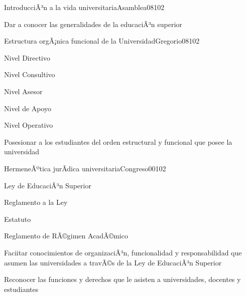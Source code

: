 \begin{syllabus}
\begin{unit}{IntroducciÃ³n a la vida universitaria}{Asamblea08}{10}{2}
   \begin{unitgoals}
      \item Dar a conocer las generalidades de la educaciÃ³n superior
   \end{unitgoals}
\end{unit}

\begin{unit}{Estructura orgÃ¡nica funcional de la Universidad}{Gregorio08}{10}{2}
   \begin{topics}
        \item Nivel Directivo
	\item Nivel Consultivo
	\item Nivel Asesor
	\item Nivel de Apoyo
	\item Nivel Operativo
  \end{topics}

   \begin{unitgoals}
      \item Posesionar a los estudiantes del orden estructural y funcional que posee la universidad
   \end{unitgoals}
\end{unit}

\begin{unit}{HermeneÃºtica jurÃ­dica universitaria}{Congreso00}{10}{2}
   \begin{topics}
        \item Ley de EducaciÃ³n Superior 
	\item Reglamento a la Ley
	\item Estatuto
	\item Reglamento de RÃ©gimen AcadÃ©mico
   \end{topics}

   \begin{unitgoals}
      \item Faciitar conocimientos de organizaciÃ³n, funcionalidad y responsabilidad que asumen las universidades a travÃ©s de la Ley de EducaciÃ³n Superior
      \item Reconocer las funciones y derechos que le asisten a universidades, docentes y estudiantes
   \end{unitgoals}
\end{unit}

\begin{coursebibliography}
\end{coursebibliography}

\end{syllabus}

